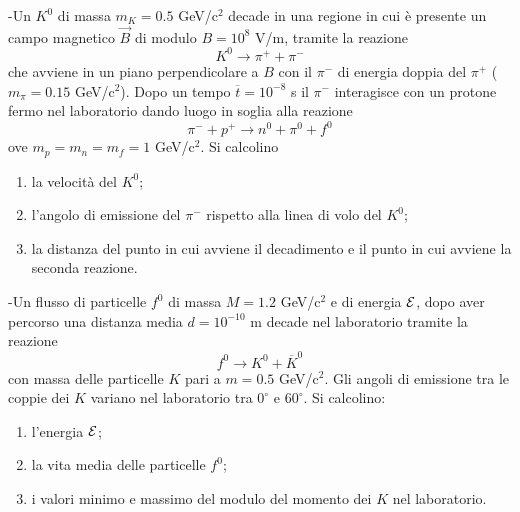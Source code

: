 \documentclass[12pt,twoside,a4]{article}
\begin{document}
\newpage
\begin{esercizio}[Esame 08-09-2014]
	-Un $K^0$ di massa $m_K = 0.5$ GeV/c$^2$ decade in una regione in cui è presente un campo magnetico $\vec{B}$ di modulo $B = 10^8$ V/m, tramite la reazione
$$ K^0 \longrightarrow \pi^+ + \pi^-$$
che avviene in un piano perpendicolare a $B$ con il $\pi^-$ di energia doppia del $\pi^+$ ($m_\pi = 0.15$ GeV/c$^2$). Dopo un tempo $\overline{t} = 10^{-8}$ s il $\pi^-$ interagisce con un protone fermo nel laboratorio dando luogo in soglia alla reazione
$$ \pi^- + p^+ \longrightarrow n^0 + \pi^0 + f^0$$
ove $m_p = m_n = m_f = 1$ GeV/c$^2$. Si calcolino
\begin{enumerate}[label=(\textit{\roman*})]
\item la velocità  del $K^0$;
\item l'angolo di emissione del $\pi^-$ rispetto alla linea di volo del $K^0$;
\item la distanza del punto in cui avviene il decadimento e il punto in cui avviene la seconda reazione.
\end{enumerate}
\end{esercizio}

\begin{esercizio}[Esame 08-09-2014]
-Un flusso di particelle $f^0$ di massa $M = 1.2$ GeV/c$^2$ e di energia $\mathcal{E}$, dopo aver percorso una distanza media $d = 10^{-10}$ m decade nel laboratorio tramite la reazione
$$ f^0 \longrightarrow K^0 + \overline{K}^0$$
con massa delle particelle $K$ pari a $m=0.5$ GeV/c$^2$. Gli angoli di emissione tra le coppie dei $K$ variano nel laboratorio tra $0^\circ$ e $60^\circ$. Si calcolino:
\begin{enumerate}[label=(\textit{\roman*})]
\item l'energia $\mathcal{E}$;
\item la vita media delle particelle $f^0$;
\item i valori minimo e massimo del modulo del momento dei $K$ nel laboratorio.
\end{enumerate}
\end{esercizio}
\end{document}
